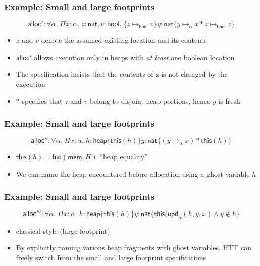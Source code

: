 \documentclass[xcolor=dvipsnames,9pt,hide notes,mathserif]{beamer}
\newcommand{\nat}{\ensuremath{\mathsf{nat}}}
\newcommand{\bool}{\ensuremath{\mathsf{bool}}}
\newcommand{\alloc}{\ensuremath{\mathsf{alloc}}}
\newcommand{\heap}{\ensuremath{\mathsf{heap}}}
\newcommand{\this}{\ensuremath{\mathsf{this}}}
\newcommand{\mem}{\ensuremath{\mathsf{mem}}}
\newcommand{\hid}{\ensuremath{\mathsf{hid}}}
\newcommand{\upd}{\ensuremath{\mathsf{upd}}}
\begin{document}
\begin{frame}
  \frametitle{Example: Small and large footprints}
\[
    \alloc': \forall \alpha.\; \Pi x{:}\alpha.\; z{:} \nat,  v{:} \bool. \;
    \{z \mapsto_{\bool} v\} y{:}\nat \{ y \mapsto_\alpha x \ast z \mapsto_{\bool} v\}
\]
  \begin{itemize}
  \item $z$ and $v$ denote the assumed existing location and its contents
  \item $\alloc'$ allows execution only in heaps with \textit{at least} one boolean location
  \item The specification insists that the contents of z is not changed by the execution
  \item $\ast$ specifies that $z$ and $v$ belong to disjoint heap portions, hence $y$ is fresh
  \end{itemize}
\end{frame}





\begin{frame}
  \frametitle{Example: Small and large footprints}

\[
   \alloc'': \forall \alpha. \; \Pi x {:} \alpha. \; h{:}\heap \{\this(h)\} y{:} \nat \{ (y \mapsto_\alpha x) * \this(h)\}
\]

  \begin{itemize}
  \item $\this(h) = \hid (\mem, H)$ ``heap equality''
  \item We can name the heap encountered before allocation using a ghost variable $h$    
  \end{itemize}

\end{frame}







\begin{frame}
  \frametitle{Example: Small and large footprints}

\[
   \alloc''': \forall \alpha. \; \Pi x {:} \alpha. \; h{:}\heap \{\this(h)\} y{:} \nat \{\this(\upd_\alpha(h,y,x) \wedge y \notin h\}
\]

  \begin{itemize}
  \item<1-> classical style (large footprint)
  \item<2-> By explicitly naming various heap fragments with ghost variables, HTT can freely switch from the small and large footprint specifications
  \end{itemize}

\end{frame}
\end{document}
